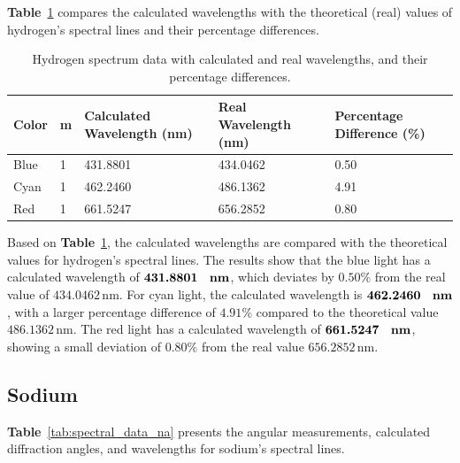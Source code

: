\documentclass[a4paper,11pt]{article}
\begin{document}
\textbf{Table}~\ref{tab:Hydrogen_spectrum} compares the calculated wavelengths with the theoretical (real) values of hydrogen's spectral lines and their percentage differences.

\begin{table}[H]
\centering
\begin{tabular}{lllll}
\toprule
\textbf{Color} & \textbf{m} & \textbf{Calculated Wavelength (nm)} & \textbf{Real Wavelength (nm)} & \textbf{Percentage Difference (\%)} \\
\midrule
Blue & 1 & 431.8801 & 434.0462 & 0.50 \\
Cyan & 1 & 462.2460 & 486.1362 & 4.91 \\
Red  & 1 & 661.5247 & 656.2852 & 0.80 \\
\bottomrule
\end{tabular}
\caption{Hydrogen spectrum data with calculated and real wavelengths, and their percentage differences.\cite{utexas_hydrogen_spectra}\cite{nist_hydrogen_spectrum}}
\label{tab:Hydrogen_spectrum}
\end{table}

\quad Based on \textbf{Table}~\ref{tab:Hydrogen_spectrum}, the calculated wavelengths are compared with the theoretical values for hydrogen's spectral lines. The results show that the blue light has a calculated wavelength of \(\textbf{431.8801 \, \text{nm}}\), which deviates by \(0.50\%\) from the real value of \(434.0462 \, \text{nm}\). For cyan light, the calculated wavelength is \(\textbf{462.2460 \, \text{nm}}\), with a larger percentage difference of \(4.91\%\) compared to the theoretical value \(486.1362 \, \text{nm}\). The red light has a calculated wavelength of \(\textbf{661.5247 \, \text{nm}}\), showing a small deviation of \(0.80\%\) from the real value \(656.2852 \, \text{nm}\).
\newpage
\subsection*{Sodium}
\label{sec:sodium}

\textbf{Table}~\ref{tab:spectral_data_na} presents the angular measurements, calculated diffraction angles, and wavelengths for sodium’s spectral lines.\\
\end{document}
